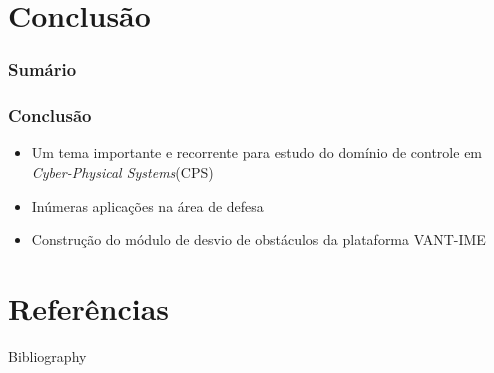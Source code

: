 \documentclass{beamer}
\begin{document}
\section{Conclusão}

\begin{frame}
	\frametitle{Sumário}
	\tableofcontents[currentsection]
\end{frame}

\begin{frame}
	
	\frametitle{Conclusão}
	
	\begin{itemize}	
		
		\item  Um tema importante e recorrente para estudo do domínio de controle em \textit{Cyber-Physical Systems}(CPS) 
		
		
		\item Inúmeras aplicações na área de defesa
		
		\item Construção do módulo de desvio de obstáculos da plataforma VANT-IME 
		
		
	\end{itemize}	
	
	
\end{frame}	


\section*{Referências}


\begin{frame}[allowframebreaks]{Bibliography}
	\frametitle{\insertsection}
	
	\footnotesize
\end{frame}


\end{document}

